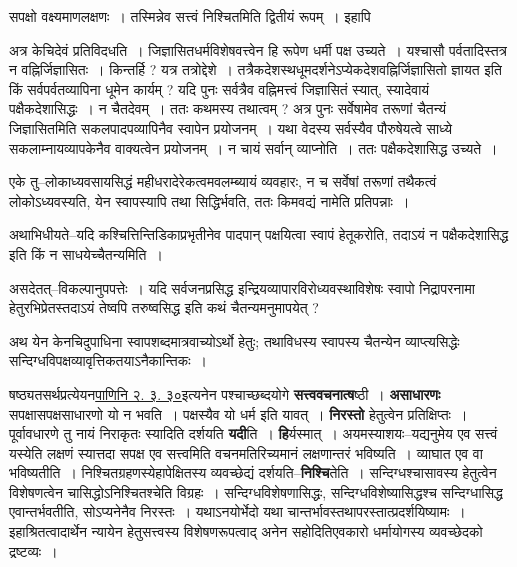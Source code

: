 \documentclass[article,12pt,a4paper]{memoir}
\begin{document}
	  \pstart सपक्षो वक्ष्यमाणलक्षणः । तस्मिन्नेव सत्त्वं निश्चितमिति द्वितीयं रूपम् । इहापि
	\pend
      
	  \endgroup
	

	  \pstart अत्र केचिदेवं प्रतिविदधति । जिज्ञासितधर्मविशेषवत्त्वेन हि रूपेण धर्मी पक्ष उच्यते । यश्चासौ पर्वतादिस्तत्र न वह्निर्जिज्ञासितः । किन्तर्हि ? यत्र तत्रोद्देशे । तत्रैकदेशस्थधूमदर्शनेऽप्येकदेशवह्निर्जिज्ञासितो ज्ञायत इति किं सर्वपर्वतव्यापिना धूमेन कार्यम् ? यदि पुनः सर्वत्रैव वह्निमत्त्वं जिज्ञासितं स्यात्, स्यादेवायं पक्षैकदेशासिद्धः । न चैतदेवम् । ततः कथमस्य तथात्वम् ? अत्र पुनः सर्वेषामेव तरूणां चैतन्यं जिज्ञासितमिति सकलपादपव्यापिनैव स्वापेन प्रयोजनम् । यथा वेदस्य सर्वस्यैव पौरुषेयत्वे साध्ये सकलाम्नायव्यापकेनैव वाक्यत्वेन प्रयोजनम् । न चायं सर्वान् व्याप्नोति । ततः पक्षैकदेशासिद्ध उच्यते ।
	\pend
      

	  \pstart एके तु--लोकाध्यवसायसिद्धं महीधरादेरेकत्वमवलम्ब्यायं व्यवहारः, न च सर्वेषां तरूणां तथैकत्वं लोकोऽध्यवस्यति, येन स्वापस्यापि तथा सिद्धिर्भवति, ततः किमवद्यं नामेति प्रतिपन्नाः ।
	\pend
      

	  \pstart अथाभिधीयते--यदि कश्चित्तिन्तिडिकाप्रभृतीनेव पादपान् पक्षयित्वा स्वापं हेतूकरोति, तदाऽयं न पक्षैकदेशासिद्ध इति किं न साधयेच्चैतन्यमिति ।
	\pend
      

	  \pstart असदेतत्--विकल्पानुपपत्तेः । यदि सर्वजनप्रसिद्ध इन्द्रियव्यापारविरोध्यवस्थाविशेषः स्वापो निद्रापरनामा हेतुरभिप्रेतस्तदाऽयं तेष्वपि तरुष्वसिद्ध इति कथं चैतन्यमनुमापयेत् ?
	\pend
      

	  \pstart अथ येन केनचिदुपाधिना स्वापशब्दमात्रवाच्योऽर्थो हेतुः; तथाविधस्य स्वापस्य चैतन्येन व्याप्त्यसिद्धेः सन्दिग्धविपक्षव्यावृत्तिकतयाऽनैकान्तिकः ।
	\pend
      

	  \pstart षष्ठ्यतसर्थप्रत्येयन\href{http://sarit.indology.info/?cref=Pā.2.3.30}{पाणिनि २. ३. ३०}इत्यनेन पश्चाच्छब्दयोगे \textbf{सत्त्ववचनात्ष}ष्ठी । \textbf{असाधारणः} सपक्षासपक्षसाधारणो यो न भवति । पक्षस्यैव यो धर्म इति यावत् । \textbf{निरस्तो} हेतुत्वेन प्रतिक्षिप्तः । पूर्वावधारणे तु नायं निराकृतः स्यादिति दर्शयति \textbf{यदी}ति । \textbf{हि}र्यस्मात् । अयमस्याशयः--यद्यनुमेय एव सत्त्वं यस्येति लक्षणं स्यात्तदा सपक्ष एव सत्त्वमिति वचनमतिरिच्यमानं लक्षणान्तरं भविष्यति । व्याघात एव वा भविष्यतीति । निश्चितग्रहणस्येहापेक्षितस्य व्यवच्छेद्यं दर्शयति--\textbf{निश्चि}तेति । सन्दिग्धश्चासावस्य हेतुत्वेन विशेषणत्वेन चासिद्धोऽनिश्चितश्चेति विग्रहः । सन्दिग्धविशेषणासिद्धः, सन्दिग्धविशेष्यासिद्धश्च सन्दिग्धासिद्ध एवान्त\leavevmode{}र्भवतीति, सोऽप्यनेनैव निरस्तः । यथाऽनयोर्भेदो यथा चान्तर्भावस्तथापरस्तात्प्रदर्शयिष्यामः । इहाश्रितत्वादार्थेन न्यायेन हेतुसत्त्वस्य विशेषणरूपत्वाद् अनेन सहोदितिएवकारो धर्मायोगस्य व्यवच्छेदको द्रष्टव्यः ।
	\pend
	  \bigskip
	  \begingroup
	
\end{document}
